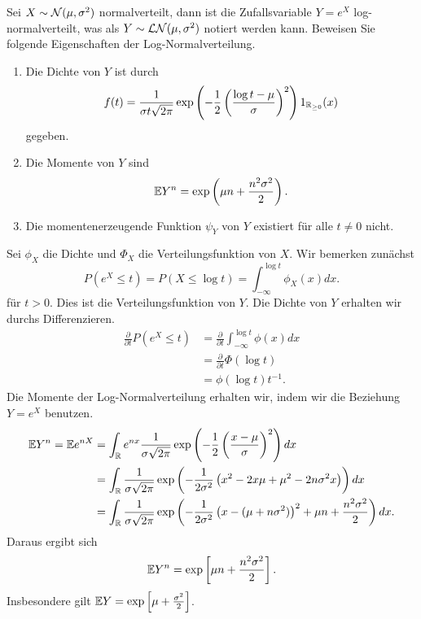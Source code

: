 Sei $X \sim \mathcal N(\mu,\sigma^2)$ normalverteilt, dann ist die Zufallsvariable 
$Y = e^{X}$ log-normalverteilt, was als $Y \sim \mathcal L\mathcal N (\mu, \sigma^2)$ notiert 
werden kann. Beweisen Sie folgende Eigenschaften der Log-Normalverteilung.
\begin{enumerate}
    \item Die Dichte von $Y$ ist durch
        \begin{equation*}
            f(t) = \frac{1}{\sigma t\sqrt{2\pi}} 
            \exp \left( -\frac{1}{2} \left( \frac{\log t -\mu}{\sigma} \right)^2  \right)
            1_{\mathbb{R}_{\geq 0}}(x) 
        \end{equation*} 
        gegeben.
    \item Die Momente von $Y$ sind 
        \begin{equation*}
            \mathbb{E} Y^n = \exp \left( \mu n + \frac{n^2\sigma^2}{2} \right).
        \end{equation*}
    \item Die momentenerzeugende Funktion $\psi_Y$ von $Y$ existiert für alle $t\neq 0$ nicht. 
\end{enumerate}

\solution
Sei $\phi_X$ die Dichte und $\Phi_X$ die Verteilungsfunktion von $X$. Wir bemerken zunächst
\begin{equation*}
    P \left( e^{X} \leq t \right) = P \left( X \leq \log t \right) = 
    \int_{- \infty}^{\log t} \phi_X (x) dx. 
\end{equation*}
für $t>0$. Dies ist die Verteilungsfunktion von $Y$. Die Dichte von $Y$
erhalten wir durchs Differenzieren.
\begin{align*}
    \frac{\partial}{\partial t} P \left( e^X \leq t \right) &= 
    \frac{\partial}{\partial t} \int_{-\infty}^{\log t} \phi(x) dx \\
    &= \frac{\partial}{\partial t} \Phi(\log t) \\
    &= \phi(\log t) t^{-1}. 
\end{align*}
Die Momente der Log-Normalverteilung erhalten wir, indem wir die Beziehung $Y=e^{X}$ benutzen. 
\begin{align*}
    \mathbb{E} Y^n = \mathbb{E} e^{nX} &= \int_{\mathbb{R}}^{} e^{nx} \frac{1}{\sigma \sqrt{2\pi} } 
    \exp \left( -\frac{1}{2} \left( \frac{x-\mu}{\sigma} \right)^2 \right) dx \\
    &= \int_{\mathbb{R}} \frac{1}{ \sigma \sqrt{2\pi}} \exp \left( 
    -\frac{1}{2\sigma^2} \left( x^2 - 2 x \mu + \mu^2 - 2n \sigma^2 x \right)
    \right) dx \\
    &= \int_{ \mathbb{R}}^{} \frac{1}{ \sigma \sqrt{2\pi} } 
    \exp \left( -\frac{1}{2\sigma^2} \left( x - (\mu + n \sigma^2) \right)^2
    + \mu n + \frac{n^2 \sigma^2}{ 2}
    \right) dx.
\end{align*}
Daraus ergibt sich
\begin{equation*}
    \mathbb{E} Y^n = \exp \left[ \mu n + \frac{n^2 \sigma^2}{2} \right]. 
\end{equation*}
Insbesondere gilt $\mathbb{E} Y = \exp \left[ \mu + \frac{\sigma^2}{2} \right]$.

